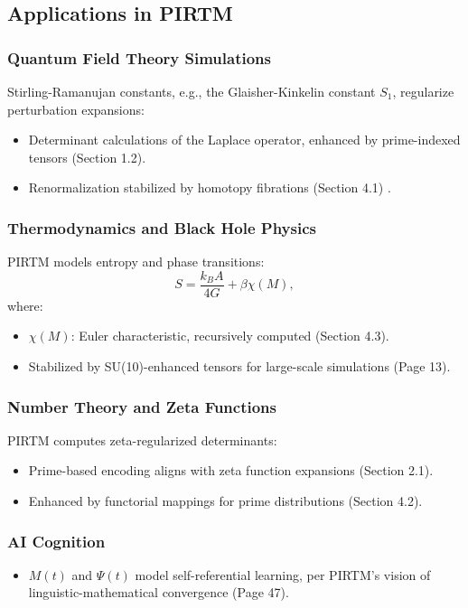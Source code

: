 \documentclass{article}
\theoremstyle{plain}
\begin{document}
\subsection{Applications in PIRTM}

\subsubsection{Quantum Field Theory Simulations}
Stirling-Ramanujan constants, e.g., the Glaisher-Kinkelin constant \( S_1 \), regularize perturbation expansions:
\begin{itemize}
    \item Determinant calculations of the Laplace operator, enhanced by prime-indexed tensors (Section 1.2).
    \item Renormalization stabilized by homotopy fibrations (Section 4.1) \cite{Hardy1949}.
\end{itemize}

\subsubsection{Thermodynamics and Black Hole Physics}
PIRTM models entropy and phase transitions:
\begin{equation}
S = \frac{k_B A}{4 G} + \beta \chi(M),
\end{equation}
where:
\begin{itemize}
    \item \( \chi(M) \): Euler characteristic, recursively computed (Section 4.3).
    \item Stabilized by SU(10)-enhanced tensors for large-scale simulations \cite{Bekenstein1973, Hawking1975} (Page 13).
\end{itemize}

\subsubsection{Number Theory and Zeta Functions}
PIRTM computes zeta-regularized determinants:
\begin{itemize}
    \item Prime-based encoding aligns with zeta function expansions (Section 2.1).
    \item Enhanced by functorial mappings for prime distributions \cite{Lagarias2013} (Section 4.2).
\end{itemize}

\subsubsection{AI Cognition}
\begin{itemize}
    \item \( M(t) \) and \( \Psi(t) \) model self-referential learning, per PIRTM’s vision of linguistic-mathematical convergence (Page 47).
\end{itemize}
\end{document}
